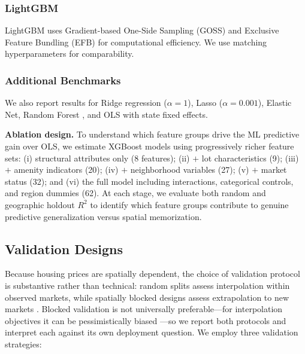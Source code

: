 \subsubsection{LightGBM}

LightGBM \citep{ke2017lightgbm} uses Gradient-based One-Side Sampling (GOSS) and Exclusive Feature Bundling (EFB) for computational efficiency. We use matching hyperparameters for comparability.

\subsubsection{Additional Benchmarks}

We also report results for Ridge regression ($\alpha = 1$), Lasso ($\alpha = 0.001$), Elastic Net, Random Forest \citep[500 trees, depth 20;][]{breiman2001random}, and OLS with state fixed effects.

\textbf{Ablation design.} To understand which feature groups drive the ML predictive gain over OLS, we estimate XGBoost models using progressively richer feature sets: (i) structural attributes only (8 features); (ii) $+$ lot characteristics (9); (iii) $+$ amenity indicators (20); (iv) $+$ neighborhood variables (27); (v) $+$ market status (32); and (vi) the full model including interactions, categorical controls, and region dummies (62). At each stage, we evaluate both random and geographic holdout $R^2$ to identify which feature groups contribute to genuine predictive generalization versus spatial memorization.

\subsection{Validation Designs}
\label{sec:validation_designs}

Because housing prices are spatially dependent, the choice of validation protocol
is substantive rather than technical: random splits assess interpolation within
observed markets, while spatially blocked designs assess extrapolation to new
markets \citep{roberts2017cross, valavi2019blockcv, meyer2021predicting}. Blocked
validation is not universally preferable---for interpolation objectives it can be
pessimistically biased \citep{wadoux2021spatial}---so we report both protocols and
interpret each against its own deployment question. We employ three validation
strategies:

